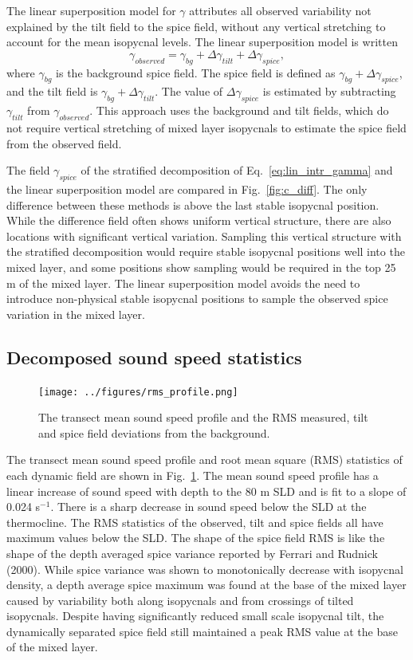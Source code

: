 \documentclass[preprint,NumberedRefs]{JASA}
\begin{document}
The linear superposition model for $\gamma$ attributes all observed variability not explained by the tilt field to the spice field, without any vertical stretching to account for the mean isopycnal levels. The linear superposition model is written
\begin{equation}
    \gamma_{observed} = \gamma_{bg} + \Delta \gamma_{tilt} + \Delta \gamma_{spice},
    \label{eq:lin_sup}
\end{equation}
where $\gamma_{bg}$ is the background spice field. The spice field is defined as $\gamma_{bg} + \Delta \gamma_{spice}$, and the tilt field is $\gamma_{bg} + \Delta \gamma_{tilt}$. The value of $\Delta \gamma_{spice}$ is estimated by subtracting $\gamma_{tilt}$ from $\gamma_{observed}$. This approach uses the background and tilt fields, which do not require vertical stretching of mixed layer isopycnals to estimate the spice field from the observed field.

The field $\gamma_{spice}$ of the stratified decomposition of Eq.~\eqref{eq:lin_intr_gamma} and the linear superposition model are compared in Fig.~\ref{fig:c_diff}. The only difference between these methods is above the last stable isopycnal position. While the difference field often shows uniform vertical structure, there are also locations with significant vertical variation. Sampling this vertical structure with the stratified decomposition would require stable isopycnal positions well into the mixed layer, and some positions show sampling would be required in the top 25 m of the mixed layer. The linear superposition model avoids the need to introduce non-physical stable isopycnal positions to sample the observed spice variation in the mixed layer.

\subsection{Decomposed sound speed statistics}
\begin{figure}
\texttt{[image: ../figures/rms\_profile.png]}
    \caption{\label{fig:c_rms}{The transect mean sound speed profile and the RMS measured, tilt and spice field deviations from the background.}}
\end{figure}

The transect mean sound speed profile and root mean square (RMS) statistics of each dynamic field are shown in Fig.~\ref{fig:c_rms}. The mean sound speed profile has a linear increase of sound speed with depth to the 80 m SLD and is fit to a slope of 0.024 s$^{-1}$. There is a sharp decrease in sound speed below the SLD at the thermocline. The RMS statistics of the observed, tilt and spice fields all have maximum values below the SLD. The shape of the spice field RMS is like the shape of the depth averaged spice variance reported by Ferrari and Rudnick (2000)\citep{ferrari2000}. While spice variance was shown to monotonically decrease with isopycnal density, a depth average spice maximum was found at the base of the mixed layer caused by variability both along isopycnals and from crossings of tilted isopycnals. Despite having significantly reduced small scale isopycnal tilt, the dynamically separated spice field still maintained a peak RMS value at the base of the mixed layer.
\end{document}
